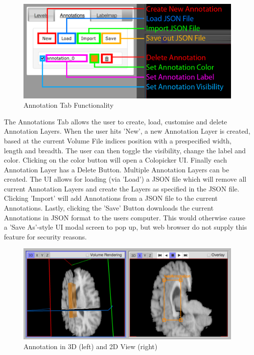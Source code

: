 \documentclass[a4paper,11pt,twoside]{article}
\begin{document}
\begin{figure}[ht!]
\centering
\includegraphics[width=140mm]{graphics/features_05.png}
\caption{Annotation Tab Functionality}
\label{fig:UIdesign1}
\end{figure}

The Annotations Tab allows the user to create, load, customise and delete Annotation Layers. When the user hits 'New', a new Annotation Layer is created, based at the current Volume File indices position with a prespecified width, length and breadth. The user can then toggle the visibility, change the label and color. Clicking on the color button will open a Colopicker UI. Finally each Annotation Layer has a Delete Button. Multiple Annotation Layers can be created. The UI allows for loading (via 'Load') a JSON file which will remove all current Annotation Layers and create the Layers as specified in the JSON file. Clicking 'Import' will add Annotations from a JSON file to the current Annotations. Lastly, clicking the 'Save' Button downloads the current Annotations in JSON format to the users computer. This would otherwise cause a 'Save As'-style UI modal screen to pop up, but web browser do not supply this feature for security reasons.



\begin{figure}[ht!]
\centering
\includegraphics[width=165mm]{graphics/annoSample_02.png}
\caption{Annotation in 3D (left) and 2D View (right)}
\label{fig:UIdesign1}
\end{figure}
\end{document}
